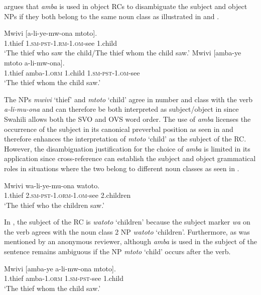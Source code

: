 \documentclass[output=paper,colorlinks,citecolor=brown]{langscibook}
\begin{document}
\citet[125--126]{Russell1992} argues that \textit{amba} is used in object RCs to disambiguate the subject and object NPs if they both belong to the same noun class as illustrated in  and .

\ea%
    \label{ex:mwamzandi:8}
    \gll    Mwivi [a-li-ye-mw-ona mtoto].\\
            1.thief  \textsc{1.sm-pst-1.rm-1.om-}see  1.child\\
    \glt    ‘The thief who saw the child/The thief whom the child saw.’
\ex%
    \label{ex:mwamzandi:9}
    \gll    Mwivi [amba-ye mtoto a-li-mw-ona].\\
            1.thief  amba\textsc{-1.orm} 1.child \textsc{1.sm-pst-1.om-}see\\
    \glt    ‘The thief whom the child saw.’
\z

The NPs \textit{mwivi} ‘thief’ and \textit{mtoto} ‘child’ agree in number and class with the verb \textit{a-li-mu-ona} and can therefore be both interpreted as subject/object in  since Swahili allows both the SVO and OVS word order. The use of \textit{amba} licenses the occurrence of the subject in its canonical preverbal position as seen in  and therefore enhances the interpretation of \textit{mtoto} ‘child’ as the subject of the RC. However, the disambiguation justification for the choice of \textit{amba} is limited in its application since cross-reference can establish the subject and object grammatical roles in situations where the two belong to different noun classes as seen in .

\ea%
    \label{ex:mwamzandi:10}
    \gll    Mwivi wa-li-ye-mu-ona watoto.\\
            1.thief  \textsc{2.sm-pst-1.orm-1.om-}see 2.children\\
    \glt    ‘The thief who the children saw.’
\z

In , the subject of the RC is \textit{watoto} ‘children’ because the subject marker \textit{wa} on the verb agrees with the noun class 2 NP \textit{watoto} ‘children’. Furthermore, as was mentioned by an anonymous reviewer, although \textit{amba} is used in  the subject of the sentence remains ambiguous if the NP \textit{mtoto} ‘child’ occurs after the verb.

\ea%
    \label{ex:mwamzandi:11}
    \gll    Mwivi [amba-ye a-li-mw-ona mtoto].\\
            1.thief  amba\textsc{-1.orm} \textsc{1.sm-pst-}see 1.child\\
    \glt    ‘The thief whom the child saw.’
\z
\end{document}
